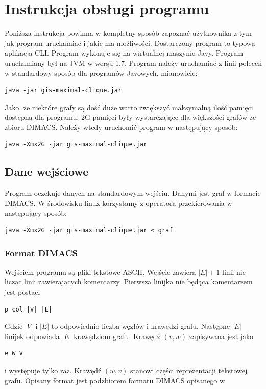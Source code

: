 \documentclass[12pt, a4paper]{article}
\begin{document}
\section{Instrukcja obsługi programu}
Poniższa instrukcja powinna w kompletny sposób zapoznać użytkownika z tym jak program uruchamiać i jakie ma możliwości. Dostarczony program to typowa aplikacja CLI. Program wykonuje się na wirtualnej maszynie Javy. Program uruchamiany był na JVM w wersji 1.7. Program należy uruchamiać z linii poleceń w standardowy sposób dla programów Javowych, mianowicie:

\begin{verbatim}
java -jar gis-maximal-clique.jar
\end{verbatim}

Jako, że niektóre grafy są dość duże warto zwiększyć maksymalną ilość pamięci dostępną dla programu. 2G pamięci były wystarczające dla większości grafów ze zbioru DIMACS. Należy wtedy uruchomić program w następujący sposób:

\begin{verbatim}
java -Xmx2G -jar gis-maximal-clique.jar
\end{verbatim}

\subsection{Dane wejściowe}
Program oczekuje danych na standardowym wejściu. Danymi jest graf w formacie DIMACS. W środowisku linux korzystamy z operatora przekierowania w następujący sposób:

\begin{verbatim}
java -Xmx2G -jar gis-maximal-clique.jar < graf
\end{verbatim}

\subsubsection{Format DIMACS}

Wejściem programu są pliki tekstowe ASCII. Wejście zawiera $|E|+1$ linii nie licząc linii zawierających komentarzy. Pierwsza linijka nie będąca komentarzem jest postaci 
\begin{verbatim}
p col |V| |E|
\end{verbatim}
Gdzie $|V|$ i $|E|$ to odpowiednio liczba węzłów i krawędzi grafu. Następne $|E|$ linijek odpowiada $|E|$ krawędziom grafu. Krawędź $(v, w)$ zapisywana jest jako 
\begin{verbatim}
e W V
\end{verbatim}
i występuje tylko raz. Krawędź $(w, v)$ stanowi części reprezentacji tekstowej grafu. Opisany format jest podzbiorem formatu DIMACS opisanego w \cite{dimacs_format}
\end{document}
